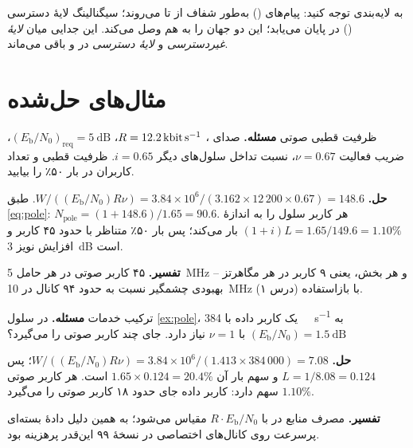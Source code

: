 \documentclass[11pt,a4paper]{article}
\begin{document}
\begin{acnfigure}
  \caption{برقراری اتصال  و  برای یک خدمت بسته‌ای (\cref{proc:rab}).}
  \label{fig:rab}
\end{acnfigure}

به لایه‌بندی توجه کنید: پیام‌های  () به‌طور شفاف از  تا
 می‌روند؛ سیگنالینگ لایهٔ دسترسی () در  پایان می‌یابد؛  این
دو جهان را به هم وصل می‌کند. این جدایی میان \emph{لایهٔ غیردسترسی} و \emph{لایهٔ دسترسی} در
 و  باقی می‌ماند.

\section{مثال‌های حل‌شده}

\begin{examplebox}{ظرفیت قطبی صوتی}\label{ex:pole}
\textbf{مسئله.} صدای ، $R=\qty{12.2}{\kilo\bit\per\second}$،
$(E_\mathrm{b}/N_0)_{\mathrm{req}} = \qty{5}{\dB}$، ضریب فعالیت $\nu=0.67$، نسبت تداخل سلول‌های دیگر
$i=0.65$. ظرفیت قطبی و تعداد کاربران در بار ۵۰٪ را بیابید.

\textbf{حل.} $W/((E_\mathrm{b}/N_0)R\nu) = 3.84\times10^6/(3.162\times12\,200\times0.67) = 148.6$.
طبق \cref{eq:pole}: $N_{\mathrm{pole}} = (1+148.6)/1.65 = 90.6$. هر کاربر سلول را به اندازهٔ
$(1+i)L = 1.65/149.6 = 1.10\%$ بار می‌کند؛ پس بار ۵۰٪ متناظر با حدود ۴۵ کاربر و افزایش نویز
\qty{3}{\dB} است.

\textbf{تفسیر.} ۴۵ کاربر صوتی در هر حامل \qty{5}{\mega\hertz} و هر بخش، یعنی ۹ کاربر در هر مگاهرتز --
بهبودی چشمگیر نسبت به حدود ۹۴ کانال  در \qty{10}{\mega\hertz} با بازاستفاده (درس ۱).
\end{examplebox}

\begin{examplebox}{ترکیب خدمات}\label{ex:mix}
\textbf{مسئله.} در سلول \cref{ex:pole}، یک کاربر داده با \qty{384}{\kilo\bit\per\second} به
$(E_\mathrm{b}/N_0) = \qty{1.5}{\dB}$ با $\nu = 1$ نیاز دارد. جای چند کاربر صوتی را می‌گیرد؟

\textbf{حل.} $W/((E_\mathrm{b}/N_0)R\nu) = 3.84\times10^6/(1.413\times384\,000) = 7.08$؛ پس
$L = 1/8.08 = 0.124$ و سهم بار آن $1.65\times0.124 = 20.4\%$ است. هر کاربر صوتی $1.10\%$ سهم دارد:
کاربر داده جای حدود ۱۸ کاربر صوتی را می‌گیرد.

\textbf{تفسیر.} مصرف منابع در  با $R\cdot E_\mathrm{b}/N_0$ مقیاس می‌شود؛ به همین دلیل
دادهٔ بسته‌ای پرسرعت روی کانال‌های اختصاصی در نسخهٔ ۹۹ این‌قدر پرهزینه بود.
\end{examplebox}
\end{document}
